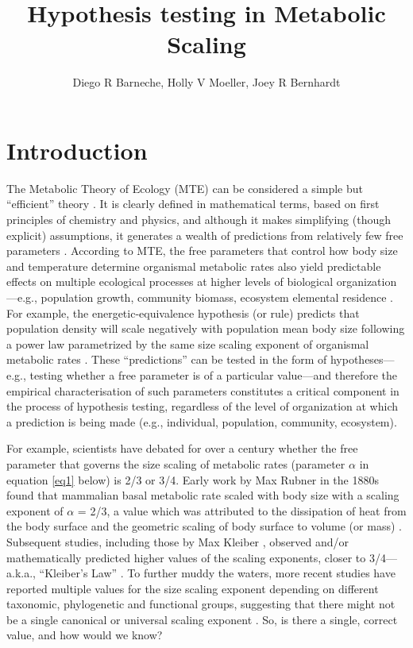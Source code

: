\documentclass[a4paper,12pt]{article}
\title{Hypothesis testing in Metabolic Scaling}
\author{Diego R Barneche, Holly V Moeller, Joey R Bernhardt}
\begin{document}
\maketitle

\section{Introduction}

The Metabolic Theory of Ecology (MTE) can be considered a simple but ``efficient'' theory \citep{marquet2014bioscience}. It is clearly defined in mathematical terms, based on first principles of chemistry and physics, and although it makes simplifying (though explicit) assumptions, it generates a wealth of predictions from relatively few free parameters \citep{marquet2014bioscience, brown2004ecology}. According to MTE, the free parameters that control how body size and temperature determine organismal metabolic rates also yield predictable effects on multiple ecological processes at higher levels of biological organization---e.g., population growth, community biomass, ecosystem elemental residence \citep{brown2004ecology, savage2004amnat, allen2005functecol, barneche2014ele, schramski2015pnas}. For example, the energetic-equivalence hypothesis (or rule) predicts that population density will scale negatively with population mean body size following a power law parametrized by the same size scaling exponent of organismal metabolic rates \citep{wright1983oikos, allen2002science, barneche2016procb}. These ``predictions'' can be tested in the form of hypotheses---e.g., testing whether a free parameter is of a particular value---and therefore the empirical characterisation of such parameters constitutes a critical component in the process of hypothesis testing, regardless of the level of organization at which a prediction is being made (e.g., individual, population, community, ecosystem).

For example, scientists have debated for over a century whether the free parameter that governs the size scaling of metabolic rates (parameter $\alpha$ in equation \ref{eq1} below) is 2/3 or 3/4. Early work by Max Rubner in the 1880s found that mammalian basal metabolic rate scaled with body size with a scaling exponent of $\alpha$ = 2/3, a value which was attributed to the dissipation of heat from the body surface and the geometric scaling of body surface to volume (or mass) \citep{rubner1883zeibiol}. Subsequent studies, including those by Max Kleiber \citeyearpar{kleiber1932hilgardia}, observed and/or mathematically predicted higher values of the scaling exponents, closer to 3/4---a.k.a., ``Kleiber's Law'' \citep{west1997science, west1999science}. To further muddy the waters, more recent studies have reported multiple values for the size scaling exponent depending on different taxonomic, phylogenetic and functional groups, suggesting that there might not be a single canonical or universal scaling exponent \citep[e.g.,][]{white2003pnas, white2005jeb, delong2010pnas}\citep[but see][for recent extensions of theoretical predictions]{brummer2017plosbiol}. So, is there a single, correct value, and how would we know?
\end{document}
